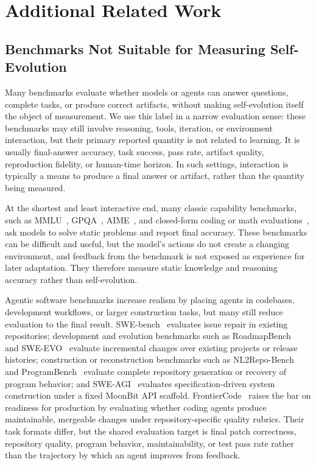 \section{Additional Related Work}
\label{sec:additional-related-work}

\subsection{Benchmarks Not Suitable for Measuring Self-Evolution}
\label{sec:additional-related-work-not-self-evolution}

Many benchmarks evaluate whether models or agents can answer questions, complete tasks, or produce correct artifacts, without making self-evolution itself the object of measurement. We use this label in a narrow evaluation sense: these benchmarks may still involve reasoning, tools, iteration, or environment interaction, but their primary reported quantity is not related to learning. It is usually final-answer accuracy, task success, pass rate, artifact quality, reproduction fidelity, or human-time horizon. In such settings, interaction is typically a means to produce a final answer or artifact, rather than the quantity being measured.

At the shortest and least interactive end, many classic capability benchmarks, such as MMLU~\cite{hendrycks2021mmlu}, GPQA~\cite{rein2023gpqa}, AIME~\cite{maa2026aime}, and closed-form coding or math evaluations~\cite{chen2021humaneval,hendrycks2021math}, ask models to solve static problems and report final accuracy. These benchmarks can be difficult and useful, but the model's actions do not create a changing environment, and feedback from the benchmark is not exposed as experience for later adaptation. They therefore measure static knowledge and reasoning accuracy rather than self-evolution.

Agentic software benchmarks increase realism by placing agents in codebases, development workflows, or larger construction tasks, but many still reduce evaluation to the final result. SWE-bench~\cite{jimenez2024swebench} evaluates issue repair in existing repositories; development and evolution benchmarks such as RoadmapBench~\cite{xu2026roadmapbench} and SWE-EVO~\cite{le2025sweevo} evaluate incremental changes over existing projects or release histories; construction or reconstruction benchmarks such as NL2Repo-Bench~\cite{ding2025nl2repobench} and ProgramBench~\cite{yang2026programbench} evaluate complete repository generation or recovery of program behavior; and SWE-AGI~\cite{zhang2026sweagi} evaluates specification-driven system construction under a fixed MoonBit API scaffold. FrontierCode~\cite{cognition2026frontiercode} raises the bar on readiness for production by evaluating whether coding agents produce maintainable, mergeable changes under repository-specific quality rubrics. Their task formats differ, but the shared evaluation target is final patch correctness, repository quality, program behavior, maintainability, or test pass rate rather than the trajectory by which an agent improves from feedback.

